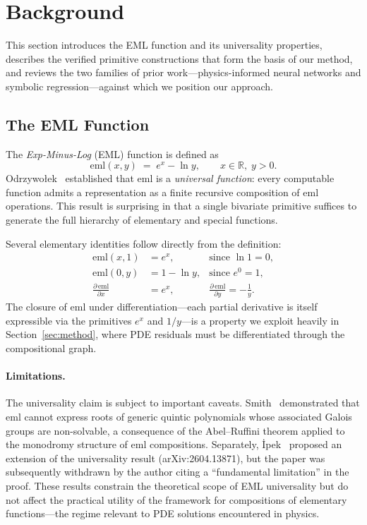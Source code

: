 \section{Background}
\label{sec:background}

This section introduces the EML function and its universality properties, describes the
verified primitive constructions that form the basis of our method, and reviews the two
families of prior work---physics-informed neural networks and symbolic
regression---against which we position our approach.

\subsection{The EML Function}
\label{sec:eml}

The \emph{Exp-Minus-Log} (EML) function is defined as
\begin{equation}
  \mathrm{eml}(x,y) \;=\; e^{x} - \ln y, \qquad x \in \mathbb{R},\; y > 0.
  \label{eq:eml-def}
\end{equation}
Odrzywo{\l}ek~\cite{odrzywołek2026} established that $\mathrm{eml}$ is a
\emph{universal function}: every computable function admits a representation as a
finite recursive composition of $\mathrm{eml}$ operations.  This result is
surprising in that a single bivariate primitive suffices to generate the full
hierarchy of elementary and special functions.

Several elementary identities follow directly from the definition:
\begin{align}
  \mathrm{eml}(x, 1) &= e^{x},
    &\text{since } \ln 1 = 0, \label{eq:eml-exp}\\
  \mathrm{eml}(0, y)  &= 1 - \ln y,
    &\text{since } e^{0} = 1, \label{eq:eml-const}\\
  \frac{\partial\,\mathrm{eml}}{\partial x} &= e^{x},
    &\frac{\partial\,\mathrm{eml}}{\partial y} = -\frac{1}{y}.
    \label{eq:eml-deriv}
\end{align}
The closure of $\mathrm{eml}$ under differentiation---each partial derivative
is itself expressible via the primitives $e^{x}$ and $1/y$---is a property we
exploit heavily in Section~\ref{sec:method}, where PDE residuals must be
differentiated through the compositional graph.

\paragraph{Limitations.}
The universality claim is subject to important caveats.
Smith~\cite{smith2024} demonstrated that $\mathrm{eml}$ cannot express roots of
generic quintic polynomials whose associated Galois groups are non-solvable,
a consequence of the Abel--Ruffini theorem applied to the monodromy structure of
$\mathrm{eml}$ compositions.  Separately, \.{I}pek~\cite{ipek2024}
proposed an extension of the universality result (arXiv:2604.13871), but the paper
was subsequently withdrawn by the author citing a ``fundamental limitation'' in the
proof.  These results constrain the theoretical scope of EML universality but do
not affect the practical utility of the framework for compositions of elementary
functions---the regime relevant to PDE solutions encountered in physics.


